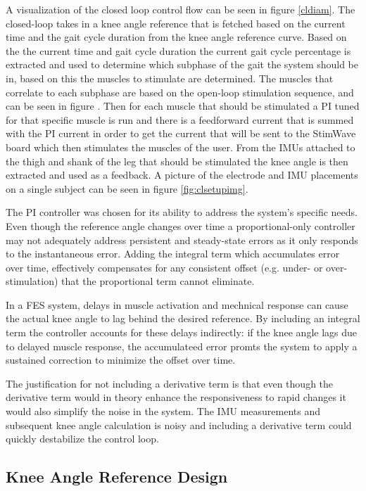 A visualization of the closed loop control flow can be seen in figure \ref{cldiam}. The closed-loop takes in a knee angle reference that is fetched based on the current time and the gait cycle duration from the knee angle reference curve. Based on the the current time and gait cycle duration the current gait cycle percentage is extracted and used to determine which subphase of the gait the system should be in, based on this the muscles to stimulate are determined. The muscles that correlate to each subphase are based on the open-loop stimulation sequence, and can be seen in figure . Then for each muscle that should be stimulated a PI tuned for that specific muscle is run and there is a feedforward current that is summed with the PI current in order to get the current that will be sent to the StimWave board which then stimulates the muscles of the user. From the IMUs attached to the thigh and shank of the leg that should be stimulated the knee angle is then extracted and used as a feedback. A picture of the electrode and IMU placements on a single subject can be seen in figure \ref{fig:clsetupimg}.

The PI controller was chosen for its ability to address the system's specific needs.  Even though the reference angle changes over time a proportional-only controller may not adequately address persistent and steady-state errors as it only responds to the instantaneous error. Adding the integral term which accumulates error over time, effectively compensates for any consistent offset (e.g. under- or over-stimulation) that the proportional term cannot eliminate. 


In a FES system, delays in muscle activation and mechnical response can cause the actual knee angle to lag behind the desired reference. By including an integral term the controller accounts for these delays indirectly: if the knee angle lags due to delayed muscle response, the accumulateed error promts the system to apply a sustained correction to minimize the offset over time.

The justification for not including a derivative term is that even though the derivative term would in theory enhance the responsiveness to rapid changes it would also simplify the noise in the system. The IMU measurements and subsequent knee angle calculation is noisy and including a derivative term could quickly destabilize the control loop.

\subsection{Knee Angle Reference Design}
